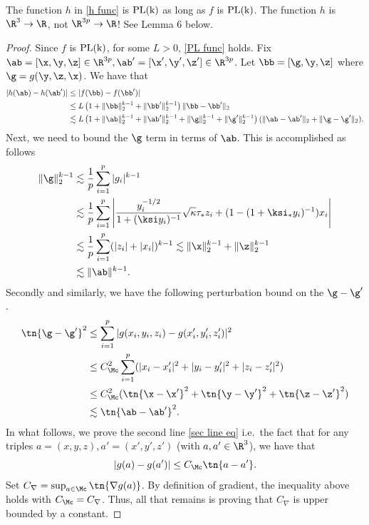\begin{lemma} The function $h$ in \eqref{h func} is $\rm{PL}(k)$ as long as $f$ is $\rm{PL}(k)$.
{\color{red}The function $h$ is $\R^3\rightarrow\R$, not $\R^{3p}\rightarrow\R$! See Lemma 6 below.}
\end{lemma}
\begin{proof} 
Since $f$ is $\rm{PL}(k)$, for some $L>0$, \eqref{PL func} holds. Fix $\ab=[\x,\y,\z]\in\R^{3p},\ab'=[\x',\y',\z']\in\R^{3p}$. Let $\bb=[\g,\y,\z]$ where $\g=g(\y,\z,\x)$. We have that
\begin{align}
|h(\ab)-h(\ab')|&\leq |f(\bb)-f(\bb')|\\
&\leq L\left(1+\|\bb\|_2^{k-1}+\|\bb'\|_2^{k-1}\right)\|\bb-\bb'\|_2\\
&\lesssim L\left(1+\|\ab\|_2^{k-1}+\|\ab'\|_2^{k-1}+\|\g\|_2^{k-1}+\|\g'\|_2^{k-1}\right)(\|\ab-\ab'\|_2+\|\g-\g'\|_2).
\end{align}
Next, we need to bound the $\g$ term in terms of $\ab$. This is accomplished as follows
\begin{align}
\|\g\|_2^{k-1}&\lesssim \frac{1}{p}\sum_{i=1}^p|g_i|^{k-1}\\
&\lesssim \frac{1}{p}\sum_{i=1}^p\left|\frac{y_i^{-1/2}}{1+(\ksi y_i)^{-1}}\sqrt{\kappa}\tau_* z_i + (1-(1+\ksi_*y_i)^{-1})x_i\right|\\
&\lesssim \frac{1}{p}\sum_{i=1}^p(|z_i|+|x_i|)^{k-1}\lesssim \|\x\|_2^{k-1}+\|\z\|_2^{k-1}\\
&\lesssim \|\ab\|^{k-1}.
\end{align}
Secondly and similarly, we have the following perturbation bound on the $\g-\g'$.  
\begin{align}
\tn{\g-\g'}^2&\leq \sum_{i=1}^p|g(x_i,y_i,z_i)-g(x'_i,y'_i,z'_i)|^2\\
&\leq C^2_{\Mc} \sum_{i=1}^p(|x_i-x'_i|^2+|y_i-y'_i|^2+|z_i-z'_i|^2)\label{sec line eq}\\
&\leq C^2_{\Mc} (\tn{\x-\x'}^2+\tn{\y-\y'}^2+\tn{\z-\z'}^2)\\
&\lesssim \tn{\ab-\ab'}^2.
\end{align}
In what follows, we prove the second line \eqref{sec line eq} i.e.~the fact that for any triples $a=(x,y,z),a'=(x',y',z')$ (with $a,a'\in\R^3$), we have that 
\[
|g(a)-g(a')|\leq C_{\Mc}\tn{a-a'}.
\]
Set $C_\nabla=\sup_{a\in \Mc}\tn{\nabla g(a)}$. By definition of gradient, the inequality above holds with $C_\Mc=C_\nabla$. Thus, all that remains is proving that $C_\nabla$ is upper bounded by a constant.  
\end{proof}



